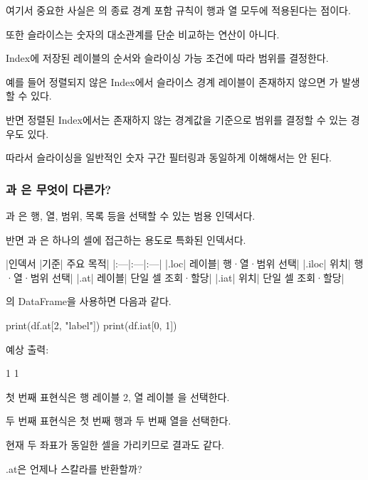 여기서 중요한 사실은 의 종료 경계 포함 규칙이 행과 열 모두에 적용된다는 점이다.

또한  슬라이스는 숫자의 대소관계를 단순 비교하는 연산이 아니다.

Index에 저장된 레이블의 순서와 슬라이싱 가능 조건에 따라 범위를 결정한다.

예를 들어 정렬되지 않은 Index에서 슬라이스 경계 레이블이 존재하지 않으면 가 발생할 수 있다.

반면 정렬된 Index에서는 존재하지 않는 경계값을 기준으로 범위를 결정할 수 있는 경우도 있다.

따라서  슬라이싱을 일반적인 숫자 구간 필터링과 동일하게 이해해서는 안 된다.

\subsubsection{과 은 무엇이 다른가?}

과 은 행, 열, 범위, 목록 등을 선택할 수 있는 범용 인덱서다.

반면 과 은 하나의 셀에 접근하는 용도로 특화된 인덱서다.

\begin{dhktable}
|인덱서	|기준|	주요 목적|
|:---|:---|:---|
|.loc|	레이블|	행·열·범위 선택|
|.iloc|	위치|	행·열·범위 선택|
|.at|	레이블|	단일 셀 조회·할당|
|.iat|	위치|	단일 셀 조회·할당|
\end{dhktable}

의 DataFrame을 사용하면 다음과 같다.

\begin{dhkcode}
print(df.at[2, "label"])
print(df.iat[0, 1])
\end{dhkcode}

예상 출력:

\begin{dhkzsh}
1
1
\end{dhkzsh}

첫 번째 표현식은 행 레이블 2, 열 레이블 을 선택한다.

두 번째 표현식은 첫 번째 행과 두 번째 열을 선택한다.

현재 두 좌표가 동일한 셀을 가리키므로 결과도 같다.

\begin{dhknote}
\begin{dhksmry}[centered]
.at은 언제나 스칼라를 반환할까?
\end{dhksmry}
\end{dhknote}

